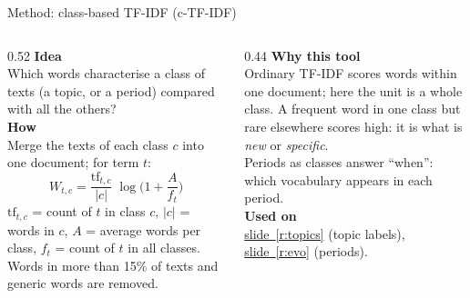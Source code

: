 \documentclass[aspectratio=169,10pt]{beamer}
\newcommand{\usedon}[1]{\hyperref[#1]{\textcolor{c4}{slide~\ref*{#1}}}}
\newcommand{\mhead}[1]{\textcolor{c1}{\textbf{#1}}\\[1pt]}
\begin{document}
\begin{frame}{Method: class-based TF-IDF (c-TF-IDF)}
\begin{columns}[T]
\begin{column}{0.52\textwidth}\footnotesize
\mhead{Idea}
Which words characterise a class of texts (a topic, or a period) compared with all the others?\\[4pt]
\mhead{How}
Merge the texts of each class $c$ into one document; for term $t$:
\[ W_{t,c} = \frac{\text{tf}_{t,c}}{|c|}\;\log\!\Big(1 + \frac{A}{f_t}\Big) \]
$\text{tf}_{t,c}$ = count of $t$ in class $c$, $|c|$ = words in $c$, $A$ = average words per class, $f_t$ = count of $t$ in all classes. Words in more than 15\% of texts and generic words are removed.
\end{column}
\begin{column}{0.44\textwidth}\footnotesize
\mhead{Why this tool}
Ordinary TF-IDF scores words within one document; here the unit is a whole class. A frequent word in one class but rare elsewhere scores high: it is what is \emph{new} or \emph{specific}.\\[3pt]
Periods as classes answer ``when'': which vocabulary appears in each period.\\[6pt]
\mhead{Used on}
\usedon{r:topics} (topic labels), \usedon{r:evo} (periods).
\end{column}
\end{columns}
\end{frame}
\end{document}
